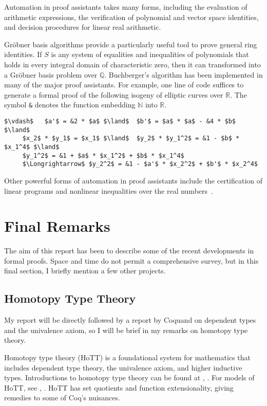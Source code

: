 \documentclass[brochure,english,12pt]{bourbaki}
\theoremstyle{plain}
\def\ring#1{{\mathbb{#1}}}
\begin{document}
Automation in proof assistants takes many forms, including the
evaluation of arithmetic expressions, the verification of polynomial and
vector space identities, and decision procedures for linear real
arithmetic.  

Gr\"obner basis algorithms provide a particularly useful tool to prove
general ring identities. If $S$ is any system of equalities and
inequalities of polynomials that holds in every integral domain of
characteristic zero, then it can transformed into a Gr\"obner basis
problem over $\ring{Q}$.  Buchberger's algorithm has been
implemented in many of the major proof assistants.  For example, one
line of code suffices to generate a formal proof of the following isogeny of
elliptic curves over $\ring{R}$.  The symbol \verb!&! denotes the function
embedding $\ring{N}$ into $\ring{R}$.

\begin{lstlisting}[keepspaces=true,stringstyle=\tt,basicstyle=\small,frame=single,framesep=8pt,mathescape,morekeywords={None},columns=flexible]
 $\vdash$   $a'$ = &2 * $a$ $\land$  $b'$ = $a$ * $a$ - &4 * $b$ $\land$ 
     $x_2$ * $y_1$ = $x_1$ $\land$  $y_2$ * $y_1^2$ = &1 - $b$ * $x_1^4$ $\land$
     $y_1^2$ = &1 + $a$ * $x_1^2$ + $b$ * $x_1^4$ 
     $\Longrightarrow$ $y_2^2$ = &1 - $a'$ * $x_2^2$ + $b'$ * $x_2^4$
\end{lstlisting}

Other powerful forms of automation in
proof assistants include the certification of linear programs and
nonlinear inequalities over the real numbers~\cite{Solovyev-thesis}.


\section{Final Remarks}

The aim of this report has been to describe some of the recent
developments in formal proofs.  Space and time do not permit a
comprehensive survey, but in this final section, I briefly mention a
few other projects.


\subsection{Homotopy Type Theory}

My report will be directly followed by a report by Coquand on
dependent types and the univalence axiom, so I will be brief in my
remarks on homotopy type theory.

Homotopy type theory (HoTT) is a foundational system for mathematics
that includes dependent type theory, the univalence axiom, and higher
inductive types.  Introductions to homotopy type theory can be found
at \cite{hottbook}, \cite{pelayo2012homotopy}.  For models of HoTT,
see \cite{awodey2007homotopy}, \cite{kapulkin2012simplicial}.  HoTT
has set quotients and function extensionality, giving remedies to some
of Coq's nuisances.
\end{document}
